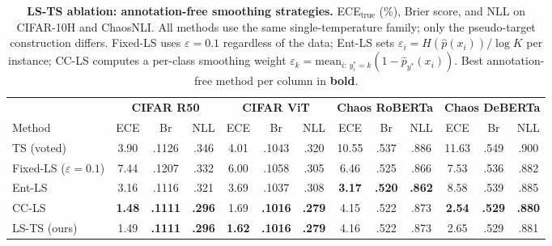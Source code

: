 \documentclass[10pt,journal,compsoc]{IEEEtran}
\begin{document}
\begin{table}[t]
  \centering
  \caption{
    \textbf{LS-TS ablation: annotation-free smoothing strategies.}
    ECE$_\text{true}$ (\%), Brier score, and NLL on CIFAR-10H and ChaosNLI.
    All methods use the same single-temperature family; only the pseudo-target construction differs.
    Fixed-LS uses $\varepsilon{=}0.1$ regardless of the data; Ent-LS sets $\varepsilon_i{=}H(\hat{p}(x_i))/\log K$ per instance; CC-LS computes a per-class smoothing weight $\varepsilon_k{=}\mathrm{mean}_{i:\,y^*_i=k}(1-\hat{p}_{y^*}(x_i))$.
    Best annotation-free method per column in \textbf{bold}.
  }
  \label{tab:lsts-ablation}
  \small
  \setlength{\tabcolsep}{4.5pt}
  \begin{tabular}{l ccc ccc ccc ccc}
    \toprule
    & \multicolumn{3}{c}{\textbf{CIFAR R50}} & \multicolumn{3}{c}{\textbf{CIFAR ViT}} & \multicolumn{3}{c}{\textbf{Chaos RoBERTa}} & \multicolumn{3}{c}{\textbf{Chaos DeBERTa}} \\
    \cmidrule(lr){2-4}\cmidrule(lr){5-7}\cmidrule(lr){8-10}\cmidrule(lr){11-13}
    Method & ECE & Br & NLL & ECE & Br & NLL & ECE & Br & NLL & ECE & Br & NLL \\
    \midrule
    TS (voted) & 3.90 & .1126 & .346 & 4.01 & .1043 & .320 & 10.55 & .537 & .886 & 11.63 & .549 & .900 \\
    \midrule
    Fixed-LS ($\varepsilon{=}0.1$) & 7.44 & .1207 & .332 & 6.00 & .1058 & .305 & 6.46 & .525 & .866 & 7.53 & .536 & .882 \\
    Ent-LS  & 3.16 & .1116 & .321 & 3.69 & .1037 & .308 & \textbf{3.17} & \textbf{.520} & \textbf{.862} & 8.58 & .539 & .885 \\
    CC-LS   & \textbf{1.48} & \textbf{.1111} & \textbf{.296} & 1.69 & \textbf{.1016} & \textbf{.279} & 4.15 & .522 & .873 & \textbf{2.54} & \textbf{.529} & \textbf{.880} \\
    LS-TS (ours) & 1.49 & \textbf{.1111} & \textbf{.296} & \textbf{1.62} & \textbf{.1016} & \textbf{.279} & 4.16 & .522 & .873 & 2.65 & .529 & .881 \\
    \bottomrule
  \end{tabular}
\end{table}
\end{document}
